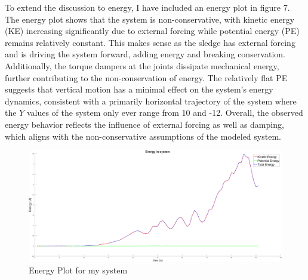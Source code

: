 \documentclass{article}
\begin{document}
To extend the discussion to energy, I have included an energy plot in figure 7. The energy plot shows that the system is non-conservative, with kinetic energy (KE) increasing significantly due to external forcing while potential energy (PE) remains relatively constant. This makes sense as the sledge has external forcing and is driving the system forward, adding energy and breaking conservation. Additionally, the torque dampers at the joints dissipate mechanical energy, further contributing to the non-conservation of energy. The relatively flat PE suggests that vertical motion has a minimal effect on the system’s energy dynamics, consistent with a primarily horizontal trajectory of the system where the $Y$ values of the system only ever range from 10 and -12. Overall, the observed energy behavior reflects the influence of external forcing as well as damping, which aligns with the non-conservative assumptions of the modeled system.
\begin{center}
	\begin{figure}[H]
		\includegraphics[width=15cm]{Energy_analysis}
		\caption{Energy Plot for my system}%
	\end{figure}
\end{center}
\end{document}
